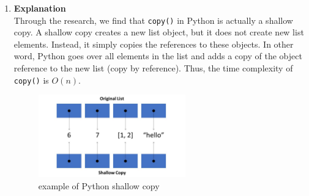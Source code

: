 \documentclass[12pt]{article}
\begin{document}
\begin{enumerate}[(1)]
\item \textbf{Explanation}\\
Through the research, we find that \verb|copy()| in Python is actually a shallow copy. A shallow copy creates a new list object, but it does not create new list elements. Instead, it simply copies the references to these objects. In other word, Python goes over all elements in the list and adds a copy of the object reference to the new list (copy by reference). Thus, the time complexity of \verb|copy()| is \(O(n)\).
\begin{figure}[h!]
\centering
\includegraphics[width=0.6\textwidth,height=0.3\textheight,keepaspectratio]{shallow_copy.jpg}
\caption{example of Python shallow copy}
\label{shallow_copy}
\end{figure}


\end{enumerate}
\end{document}
